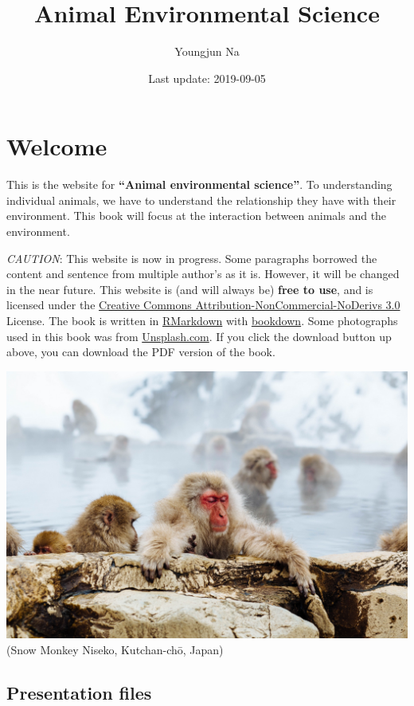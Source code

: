 \documentclass[]{book}
\title{Animal Environmental Science}
\author{Youngjun Na}
\date{Last update: 2019-09-05}
\begin{document}
\maketitle

{
\setcounter{tocdepth}{1}
\tableofcontents
}
\chapter*{Welcome}\label{welcome}

This is the website for \textbf{``Animal environmental science''}. To
understanding individual animals, we have to understand the relationship
they have with their environment. This book will focus at the
interaction between animals and the environment.

\emph{CAUTION}: This website is now in progress. Some paragraphs
borrowed the content and sentence from multiple author's as it is.
However, it will be changed in the near future. This website is (and
will always be) \textbf{free to use}, and is licensed under the
\href{http://creativecommons.org/licenses/by-nc-nd/3.0/us/}{Creative
Commons Attribution-NonCommercial-NoDerivs 3.0} License. The book is
written in \href{https://rmarkdown.rstudio.com}{RMarkdown} with
\href{https://bookdown.org}{bookdown}. Some photographs used in this
book was from \href{https://unsplash.com/}{Unsplash.com}. If you click
the download button up above, you can download the PDF version of the
book.

\includegraphics{figures/monkey.jpeg}\\
(Snow Monkey Niseko, Kutchan-chō, Japan)

\section{Presentation files}\label{presentation-files}
\end{document}
